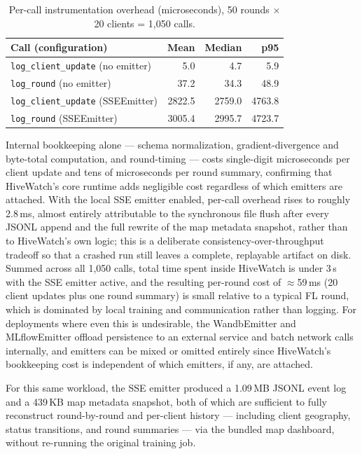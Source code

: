 \begin{table}[t]
\caption{Per-call instrumentation overhead (microseconds), 50 rounds $\times$ 20 clients = 1{,}050 calls.}
\label{tab:overhead}
\centering
\begin{tabular}{lrrr}
\toprule
\textbf{Call (configuration)} & \textbf{Mean} & \textbf{Median} & \textbf{p95} \\
\midrule
\texttt{log\_client\_update} (no emitter) & 5.0 & 4.7 & 5.9 \\
\texttt{log\_round} (no emitter)           & 37.2 & 34.3 & 48.9 \\
\texttt{log\_client\_update} (SSEEmitter)  & 2822.5 & 2759.0 & 4763.8 \\
\texttt{log\_round} (SSEEmitter)           & 3005.4 & 2995.7 & 4723.7 \\
\bottomrule
\end{tabular}
\end{table}

Internal bookkeeping alone — schema normalization, gradient-divergence and byte-total computation, and round-timing — costs single-digit microseconds per client update and tens of microseconds per round summary, confirming that HiveWatch's core runtime adds negligible cost regardless of which emitters are attached. With the local SSE emitter enabled, per-call overhead rises to roughly 2.8\,ms, almost entirely attributable to the synchronous file flush after every JSONL append and the full rewrite of the map metadata snapshot, rather than to HiveWatch's own logic; this is a deliberate consistency-over-throughput tradeoff so that a crashed run still leaves a complete, replayable artifact on disk. Summed across all 1{,}050 calls, total time spent inside HiveWatch is under 3\,s with the SSE emitter active, and the resulting per-round cost of $\approx$59\,ms (20 client updates plus one round summary) is small relative to a typical FL round, which is dominated by local training and communication rather than logging. For deployments where even this is undesirable, the WandbEmitter and MLflowEmitter offload persistence to an external service and batch network calls internally, and emitters can be mixed or omitted entirely since HiveWatch's bookkeeping cost is independent of which emitters, if any, are attached.

For this same workload, the SSE emitter produced a 1.09\,MB JSONL event log and a 439\,KB map metadata snapshot, both of which are sufficient to fully reconstruct round-by-round and per-client history — including client geography, status transitions, and round summaries — via the bundled map dashboard, without re-running the original training job.

